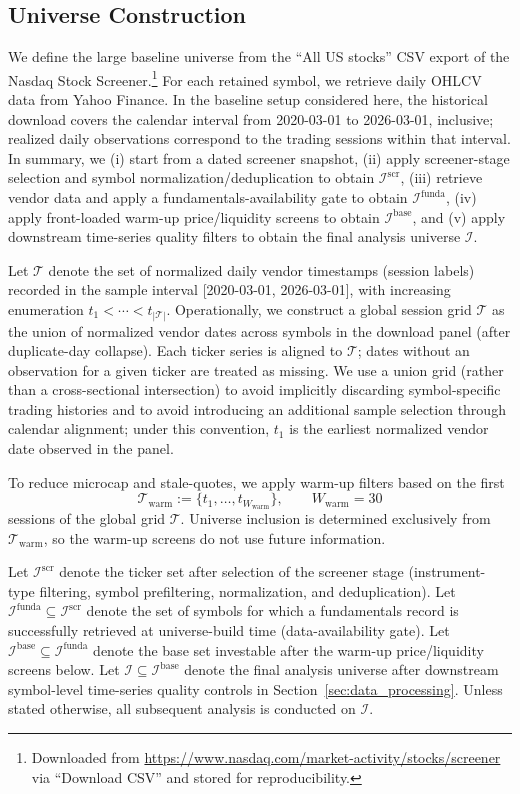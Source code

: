 \documentclass[11pt,a4paper]{article}
\begin{document}
\subsection{Universe Construction}

We define the large baseline universe from the ``All US stocks'' CSV export of
the Nasdaq Stock Screener.\footnote{Downloaded from
\url{https://www.nasdaq.com/market-activity/stocks/screener} via ``Download CSV''
and stored for reproducibility.}
For each retained symbol, we retrieve daily OHLCV data from Yahoo Finance. In the baseline setup considered here, the historical download covers the calendar interval from 2020-03-01 to 2026-03-01, inclusive; realized daily observations correspond to the trading sessions within that interval.
In summary, we (i) start from a dated screener snapshot, (ii) apply screener-stage
selection and symbol normalization/deduplication to obtain
$\mathcal{I}^{\mathrm{scr}}$, (iii) retrieve vendor data and apply a
fundamentals-availability gate to obtain $\mathcal{I}^{\mathrm{funda}}$,
(iv) apply front-loaded warm-up price/liquidity screens to obtain
$\mathcal{I}^{\mathrm{base}}$, and (v) apply downstream time-series quality
filters to obtain the final analysis universe $\mathcal{I}$.

Let $\mathcal{T}$ denote the set of normalized daily vendor timestamps
(session labels) recorded in the sample interval
[2020-03-01, 2026-03-01], with increasing
enumeration $t_1 < \cdots < t_{|\mathcal{T}|}$. Operationally, we construct a
global session grid $\mathcal{T}$ as the union of normalized vendor dates across
symbols in the download panel (after duplicate-day collapse). Each ticker series
is aligned to $\mathcal{T}$; dates without an observation for a given ticker are
treated as missing. We use a union grid (rather than a cross-sectional intersection) to avoid implicitly discarding symbol-specific trading histories and to avoid introducing an additional sample selection through calendar alignment; under this convention, $t_1$ is the earliest normalized vendor date observed in the panel.

To reduce microcap and stale-quotes, we apply warm-up filters based on
the first
\[
\mathcal{T}_{\mathrm{warm}} := \{t_1,\dots,t_{W_{\mathrm{warm}}}\}, \qquad
W_{\mathrm{warm}}=30
\]
sessions of the global grid $\mathcal{T}$.
Universe inclusion is determined exclusively from $\mathcal{T}_{\mathrm{warm}}$, so
the warm-up screens do not use future information.

Let $\mathcal{I}^{\mathrm{scr}}$ denote the ticker set after
selection of the screener stage (instrument-type filtering, symbol prefiltering, normalization, and
deduplication). Let
$\mathcal{I}^{\mathrm{funda}} \subseteq \mathcal{I}^{\mathrm{scr}}$ denote the
set of symbols for which a fundamentals record is successfully retrieved at
universe-build time (data-availability gate). Let
$\mathcal{I}^{\mathrm{base}} \subseteq \mathcal{I}^{\mathrm{funda}}$ denote the
base set investable after the warm-up price/liquidity screens below. Let
$\mathcal{I} \subseteq \mathcal{I}^{\mathrm{base}}$ denote the final analysis
universe after downstream symbol-level time-series quality controls in
Section~\ref{sec:data_processing}. Unless stated otherwise, all subsequent
analysis is conducted on $\mathcal{I}$.
\end{document}
